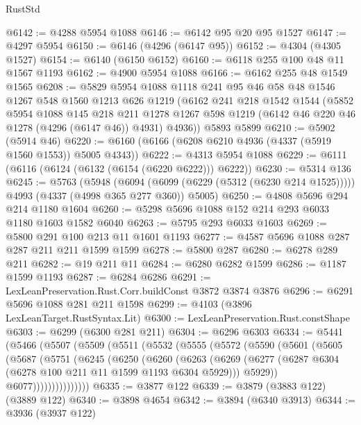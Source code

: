 \begin{lexlean}{RustStd}
\begin{coremodule}
{\begin{coremodule}
{{{{{{{{{{{{{{{{{{{{{{{{{{{{{{{{@6142 := @4288 @5954 @1088
@6146 := @6142 @95 @20 @95 @1527
@6147 := @4297 @5954
@6150 := @6146 (@4296 (@6147 @95))
@6152 := @4304 (@4305 @1527)
@6154 := @6140 (@6150 @6152)
@6160 := @6118 @255 @100 @48 @11 @1567 @1193
@6162 := @4900 @5954 @1088
@6166 := @6162 @255 @48 @1549 @1565
@6208 := @5829
    @5954
    @1088
    @1118
    @241
    @95
    @46
    @58
    @48
    @1546
    @1267
    @548
    @1560
    @1213
    @626
    @1219
    (@6162
      @241
      @218
      @1542
      @1544
      (@5852
        @5954
        @1088
        @145
        @218
        @211
        @1278
        @1267
        @598
        @1219
        (@6142 @46 @220 @46 @1278 (@4296 (@6147 @46)) @4931)
        @4936))
    @5893
    @5899
@6210 := @5902 (@5914 @46)
@6220 := @6160 (@6166 (@6208 @6210 @4936 (@4337 (@5919 @1560 @1553)) @5005 @4343))
@6222 := @4313 @5954 @1088
@6229 := @6111 (@6116 (@6124 (@6132 (@6154 (@6220 @6222))) @6222))
@6230 := @5314 @136
@6245 := @5763
    (@5948
      (@6094 (@6099 (@6229 (@5312 (@6230 @214 @1525)))))
      @4993
      (@4337 (@4998 @365 @277 @360))
      @5005)
@6250 := @4808 @5696 @294 @214 @1180 @1604
@6260 := @5298 @5696 @1088 @152 @214 @293 @6033 @1180 @1603 @1582 @6040
@6263 := @5795 @293 @6033 @1603
@6269 := @5800 @291 @100 @213 @11 @1601 @1193
@6277 := @4587 @5696 @1088 @287 @287 @211 @211 @1599 @1599
@6278 := @5800 @287
@6280 := @6278 @289 @211
@6282 := @19 @211 @11
@6284 := @6280 @6282 @1599
@6286 := @1187 @1599 @1193
@6287 := @6284 @6286
@6291 := LexLeanPreservation.Rust.Corr.buildConst @3872 @3874 @3876
@6296 := @6291 @5696 @1088 @281 @211 @1598
@6299 := @4103 (@3896 LexLeanTarget.RustSyntax.Lit)
@6300 := LexLeanPreservation.Rust.constShape
@6303 := @6299 (@6300 @281 @211)
@6304 := @6296 @6303
@6334 := @5441
    (@5466
      (@5507
        (@5509
          (@5511
            (@5532
              (@5555
                (@5572
                  (@5590
                    (@5601
                      (@5605
                        (@5687
                          (@5751
                            (@6245
                              (@6250
                                (@6260
                                  (@6263
                                    (@6269
                                      (@6277
                                        (@6287 @6304 (@6278 @100 @211 @11 @1599 @1193 @6304 @5929)))
                                      @5929))
                                  @6077)))))))))))))))
@6335 := @3877 @122
@6339 := @3879 (@3883 @122) (@3889 @122)
@6340 := @3898 @4654
@6342 := @3894 (@6340 @3913)
@6344 := @3936 (@3937 @122)
}}}}}}}}}}}}}}}}}}}}}}}}}}}}}}}}
\end{coremodule}}
\end{coremodule}
\end{lexlean}
